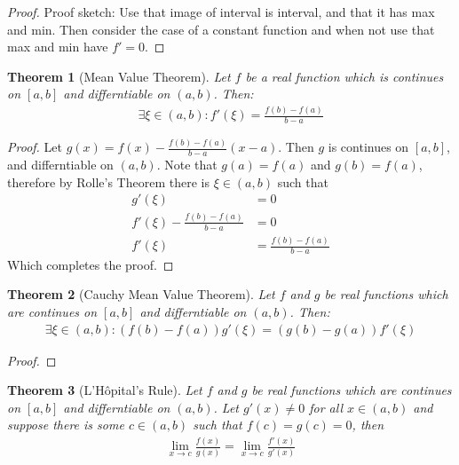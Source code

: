 \documentclass[a4paper,11pt]{article}
\theoremstyle{plain}
\newtheorem{theorem}{Theorem}
\theoremstyle{definition}
\begin{document}
\begin{proof}
	Proof sketch: Use that image of interval is interval, and that it has max
	and min. Then consider the case of a constant function and when not use that
	max and min have $f'=0$.
\end{proof}
\begin{theorem}[Mean Value Theorem]
	Let $f$ be a real function which is continues on $[a,b]$ and differntiable
	on $(a,b)$. Then:
	\begin{equation}
	\begin{aligned}
		\exists \xi \in (a,b):f'(\xi) =\frac{f(b)-f(a)}{b-a}
	\end{aligned}
	\end{equation}
\end{theorem}
\begin{proof}
	Let $g(x)=f(x)-\frac{f(b)-f(a)}{b-a}(x-a)$. Then $g$ is continues on
	$[a,b]$, and differntiable on $(a,b)$. Note that $g(a)=f(a)$ and
	$g(b)=f(a)$, therefore by Rolle's Theorem there is $\xi\in(a,b)$ such that
	\begin{equation}
	\begin{aligned}
		g'(\xi) &= 0\\
		f'(\xi)-\frac{f(b)-f(a)}{b-a} &= 0\\
		f'(\xi) &= \frac{f(b)-f(a)}{b-a}
	\end{aligned}
	\end{equation}
	Which completes the proof.
\end{proof}
\begin{theorem}[Cauchy Mean Value Theorem]
	Let $f$ and $g$ be real functions which are continues on $[a,b]$ and 
	differntiable on $(a,b)$. Then:
	\begin{equation}
	\begin{aligned}
		\exists \xi \in (a,b):(f(b)-f(a))g'(\xi)=(g(b)-g(a))f'(\xi)
	\end{aligned}
	\end{equation}
\end{theorem}
\begin{proof}
\end{proof}
\begin{theorem}[L'H\^{o}pital's Rule]
	Let $f$ and $g$ be real functions which are continues on $[a,b]$ and 
	differntiable on $(a,b)$. Let $g'(x)\neq 0$ for all $x\in(a,b)$ and suppose
	there is some $c\in(a,b)$ such that $f(c)=g(c)=0$, then
	\begin{equation}
	\begin{aligned}
		\lim_{x\rightarrow c}\frac{f(x)}{g(x)}
		=\lim_{x\rightarrow c}\frac{f'(x)}{g'(x)}
	\end{aligned}
	\end{equation}
\end{theorem}
\end{document}
